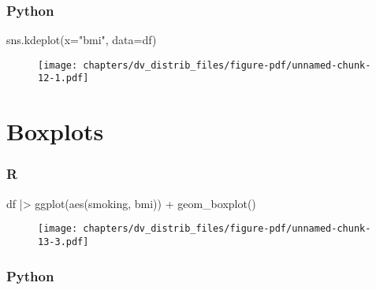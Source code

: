 \documentclass[
  letterpaper,
  DIV=11,
  numbers=noendperiod]{scrreprt}
\newenvironment{Shaded}{\begin{snugshade}}{\end{snugshade}}
\newcommand{\FunctionTok}[1]{\textcolor[rgb]{0.28,0.35,0.67}{#1}}
\newcommand{\NormalTok}[1]{\textcolor[rgb]{0.00,0.46,0.62}{#1}}
\newcommand{\OperatorTok}[1]{\textcolor[rgb]{0.37,0.37,0.37}{#1}}
\newcommand{\SpecialCharTok}[1]{\textcolor[rgb]{0.37,0.37,0.37}{#1}}
\newcommand{\StringTok}[1]{\textcolor[rgb]{0.13,0.47,0.30}{#1}}
\begin{document}
\hypertarget{python-47}{%
\subsubsection{Python}\label{python-47}}

\begin{Shaded}
\begin{Highlighting}[]
\NormalTok{sns.kdeplot(x}\OperatorTok{=}\StringTok{"bmi"}\NormalTok{, data}\OperatorTok{=}\NormalTok{df)}
\end{Highlighting}
\end{Shaded}

\begin{figure}[H]

{\centering \texttt{[image: chapters/dv\_distrib\_files/figure-pdf/unnamed-chunk-12-1.pdf]}

}

\end{figure}

\hypertarget{boxplots}{%
\section{Boxplots}\label{boxplots}}

\hypertarget{r-48}{%
\subsubsection{R}\label{r-48}}

\begin{Shaded}
\begin{Highlighting}[]
\NormalTok{df }\SpecialCharTok{|\textgreater{}} 
    \FunctionTok{ggplot}\NormalTok{(}\FunctionTok{aes}\NormalTok{(smoking, bmi)) }\SpecialCharTok{+}
    \FunctionTok{geom\_boxplot}\NormalTok{()}
\end{Highlighting}
\end{Shaded}

\begin{figure}[H]

{\centering \texttt{[image: chapters/dv\_distrib\_files/figure-pdf/unnamed-chunk-13-3.pdf]}

}

\end{figure}

\hypertarget{python-48}{%
\subsubsection{Python}\label{python-48}}
\end{document}
